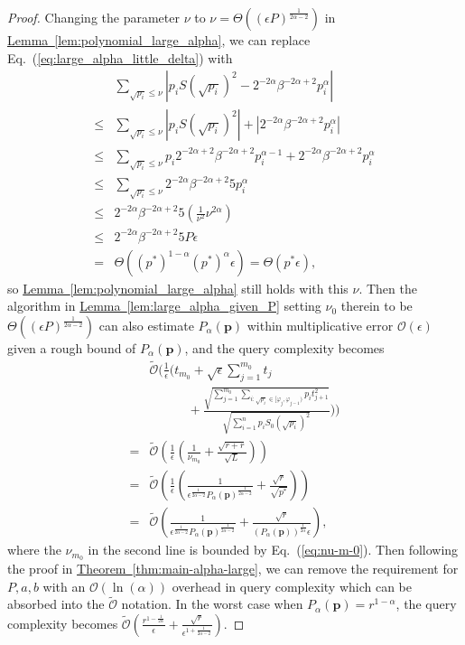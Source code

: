 \documentclass[journal]{IEEEtran}
\newcommand{\eq}[1]{Eq.~(\ref{eq:#1})}
\newcommand{\thm}[1]{\hyperref[thm:#1]{Theorem~\ref*{thm:#1}}}
\newcommand{\lem}[1]{\hyperref[lem:#1]{Lemma~\ref*{lem:#1}}}
\begin{document}
\begin{proof}
Changing the parameter $\nu$ to $\nu = \Theta((\epsilon P)^{\frac{1}{2\alpha-2}})$ in \lem{polynomial_large_alpha}, we can replace \eq{large_alpha_little_delta} with 
\begin{align}
  & \sum_{\sqrt{p_i} \le \nu} |p_iS(\sqrt{p_i})^2-2^{-2\alpha}\beta^{-2\alpha+2}p_i^{\alpha}| \nonumber \\
  \le & \sum_{\sqrt{p_i} \le \nu}|p_iS(\sqrt{p_i})^2| + |2^{-2\alpha}\beta^{-2\alpha+2}p_i^{\alpha}| \nonumber \\
  \le & \sum_{\sqrt{p_i} \le \nu} p_i2^{-2\alpha+2}\beta^{-2\alpha+2}p_i^{\alpha-1} + 2^{-2\alpha}\beta^{-2\alpha+2}p_i^{\alpha} \nonumber   \\
  \le & \sum_{\sqrt{p_i} \le \nu} 2^{-2\alpha}\beta^{-2\alpha+2}5p_i^{\alpha} \nonumber  \\
  \le & 2^{-2\alpha}\beta^{-2\alpha+2}5(\frac{1}{\nu^2}\nu^{2\alpha}) \nonumber \\
  \le & 2^{-2\alpha}\beta^{-2\alpha+2}5P\epsilon \nonumber \\
  =& \Theta((p^*)^{1-\alpha}(p^*)^{\alpha}\epsilon) = \Theta(p^*\epsilon),
\end{align}
  so \lem{polynomial_large_alpha} still holds with this $\nu$. Then the algorithm in \lem{large_alpha_given_P} setting $\nu_0$ therein to be $\Theta((\epsilon P)^{\frac{1}{2\alpha-2}})$ can also estimate $P_{\alpha}(\mathbf{p})$ within multiplicative error $\mathcal{O}(\epsilon)$ given a rough bound of $P_{\alpha}(\mathbf{p})$, and the query complexity becomes
  \begin{align}
    &\widetilde{\mathcal{O}}\biggl(\frac{1}{\epsilon}\biggl(t_{m_0} + \sqrt{\epsilon} \sum_{j=1}^{m_0} t_j \nonumber \\ 
    &\qquad\quad + \frac{\sqrt{\sum_{j = 1}^{m_0}\sum_{i:\sqrt{p_i}\in[\varphi_{j},\varphi_{j-1})}p_i t_{j+1}^2}}{\sqrt{\sum_{i = 1}^np_iS_0(\sqrt{p_i})^2}}\biggr)\biggr) \nonumber\\
    =&\widetilde{\mathcal{O}}\left(\frac{1}{\epsilon}\left(\frac{1}{\nu_{m_0}} + \frac{\sqrt{r+r}}{\sqrt{L}}\right)\right) \nonumber\\
    =&\widetilde{\mathcal{O}}\left(\frac{1}{\epsilon}\left(\frac{1}{\epsilon^{\frac{1}{2\alpha-2}}P_{\alpha}(\mathbf{p})^{\frac{1}{2\alpha-2}}} + \frac{\sqrt{r}}{\sqrt{p^*}}\right)\right) \nonumber\\
    =&\widetilde{\mathcal{O}}\left(\frac{1}{\epsilon^{\frac{1}{2\alpha-2}}P_{\alpha}(\mathbf{p})^{\frac{1}{2\alpha-2}}}+\frac{\sqrt{r}}{(P_{\alpha}(\mathbf{p}))^{\frac{1}{2\alpha}}\epsilon}\right), 
\end{align}
where the $\nu_{m_0}$ in the second line is bounded by \eq{nu-m-0}.
Then following the proof in \thm{main-alpha-large}, we can remove the requirement for $P,a,b$ with an $\mathcal{O}(\ln(\alpha))$ overhead in query complexity which can be absorbed into the $\widetilde{\mathcal{O}}$ notation. In the worst case when $P_{\alpha}(\mathbf{p}) = r^{1-\alpha}$, the query complexity becomes $\widetilde{\mathcal{O}}\left(\frac{r^{1-\frac{1}{2\alpha}}}{\epsilon} + \frac{\sqrt{r}}{\epsilon^{1+\frac{1}{2\alpha-2}}}\right)$. 
\end{proof}
\end{document}
